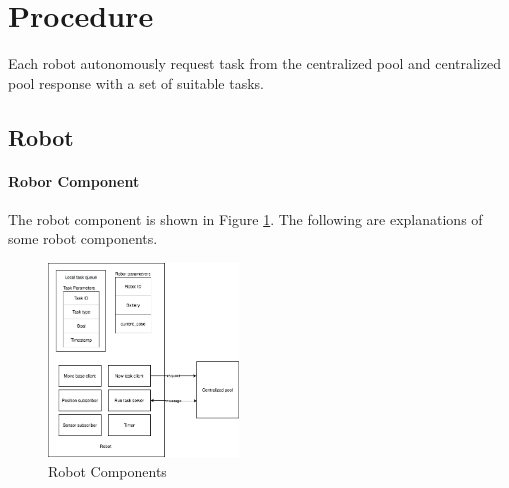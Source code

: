 \section{Procedure}
Each robot autonomously request task from the centralized pool and centralized pool response with a set of suitable tasks. 
\subsection{Robot}
\paragraph{Robor Component} The robot component is shown in Figure \ref{fig:robot_components}. The following are explanations of some robot components.


\begin{figure}[htbp]
	\centering
	\includegraphics[width = 0.45\textwidth]{content/images/ch4/system_component_robot.drawio.png}
	\caption{Robot Components}
	\label{fig:robot_components}
\end{figure}

